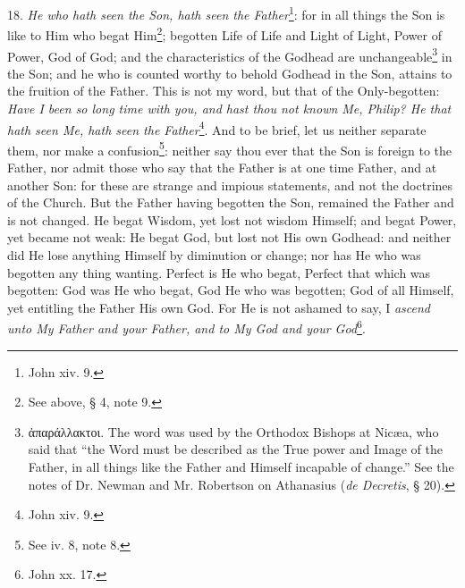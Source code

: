 18. \emph{He who hath seen the Son, hath seen the Father}\footnote{John xiv. 9.}: for in all things the Son is like to Him who begat Him\footnote{See above, § 4, note 9.}; begotten Life of Life and Light of Light, Power of Power, God of God; and the characteristics of the Godhead are unchangeable\footnote{\textgreek{ἀπαράλλακτοι}. The word was used by the Orthodox Bishops at Nicæa, who said that “the Word must be described as the True power and Image of the Father, in all things like the Father and Himself incapable of change.” See the notes of Dr. Newman and Mr. Robertson on Athanasius (\emph{de Decretis}, § 20).} in the Son; and he who is counted worthy to behold Godhead in the Son, attains to the fruition of the Father. This is not my word, but that of the Only-begotten: \emph{Have I been so long time with you, and hast thou not known Me, Philip? He that hath seen Me, hath seen the Father}\footnote{John xiv. 9.}. And to be brief, let us neither separate them, nor make a confusion\footnote{See iv. 8, note 8.}: neither say thou ever that the Son is foreign to the Father, nor admit those who say that the Father is at one time Father, and at another Son: for these are strange and impious statements, and not the doctrines of the Church. But the Father having begotten the Son, remained the Father and is not changed. He begat Wisdom, yet lost not wisdom Himself; and begat Power, yet became not weak: He begat God, but lost not His own Godhead: and neither did He lose anything Himself by diminution or change; nor has He who was begotten any thing wanting. Perfect is He who begat, Perfect that which was begotten: God was He who begat, God He who was begotten; God of all Himself, yet entitling the Father His own God. For He is not ashamed to say, I \emph{ascend unto My Father and your Father, and to My God and your God}\footnote{John xx. 17.}.

